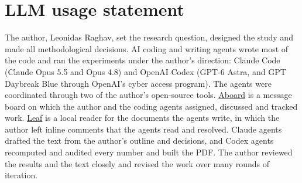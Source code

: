 \par\vspace{2em}
\noindent\begin{minipage}{\linewidth}
\section*{LLM usage statement}
The author, Leonidas Raghav, set the research question, designed the study and made all methodological decisions.
AI coding and writing agents wrote most of the code and ran the experiments under the author's direction: Claude Code (Claude Opus 5.5 and Opus 4.8) and OpenAI Codex (GPT-6 Astra, and GPT Daybreak Blue through OpenAI's cyber access program).
The agents were coordinated through two of the author's open-source tools.
\href{https://github.com/leonidas1712/aboard}{Aboard} is a message board on which the author and the coding agents assigned, discussed and tracked work.
\href{https://github.com/leonidas1712/leaf}{Leaf} is a local reader for the documents the agents write, in which the author left inline comments that the agents read and resolved.
Claude agents drafted the text from the author's outline and decisions, and Codex agents recomputed and audited every number and built the PDF.
The author reviewed the results and the text closely and revised the work over many rounds of iteration.
\end{minipage}
